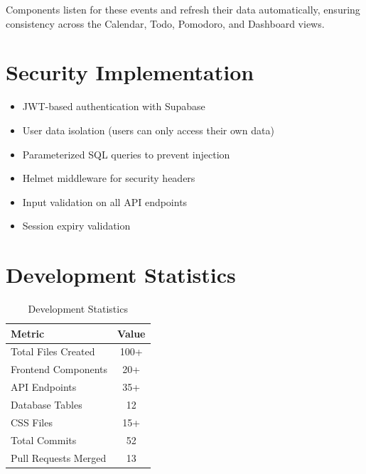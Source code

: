 Components listen for these events and refresh their data automatically, ensuring consistency across the Calendar, Todo, Pomodoro, and Dashboard views.

\section{Security Implementation}
\begin{itemize}
    \item JWT-based authentication with Supabase
    \item User data isolation (users can only access their own data)
    \item Parameterized SQL queries to prevent injection
    \item Helmet middleware for security headers
    \item Input validation on all API endpoints
    \item Session expiry validation
\end{itemize}

\section{Development Statistics}

\begin{table}[H]
\centering
\begin{tabular}{|l|c|}
\hline
\textbf{Metric} & \textbf{Value} \\
\hline
Total Files Created & 100+ \\
Frontend Components & 20+ \\
API Endpoints & 35+ \\
Database Tables & 12 \\
CSS Files & 15+ \\
Total Commits & 52 \\
Pull Requests Merged & 13 \\
\hline
\end{tabular}
\caption{Development Statistics}
\end{table}
